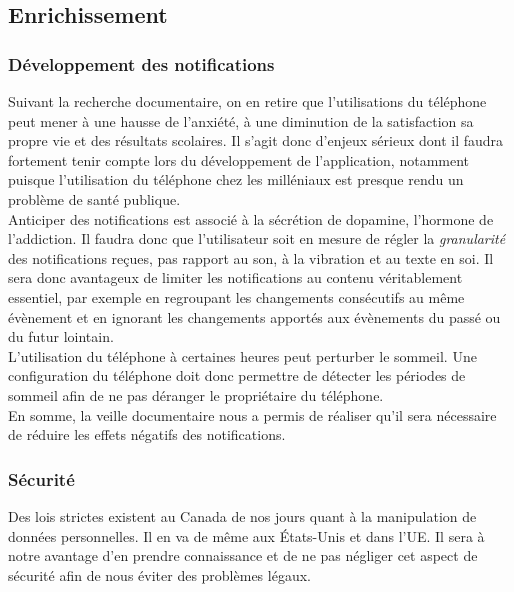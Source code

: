 	\subsection{Enrichissement}
	
		\subsubsection{Développement des notifications}

		Suivant la recherche documentaire, on en retire que l'utilisations du téléphone peut mener à une hausse de l'anxiété, à une diminution de la satisfaction sa propre vie et des résultats scolaires. Il s'agit donc d'enjeux sérieux dont il faudra fortement tenir compte lors du développement de l'application, notamment puisque l'utilisation du téléphone chez les milléniaux est presque rendu un problème de santé publique. \\
		
		Anticiper des notifications est associé à la sécrétion de dopamine, l'hormone de l'addiction. Il faudra donc que l'utilisateur soit en mesure de régler la \emph{granularité} des notifications reçues, pas rapport au son, à la vibration et au texte en soi. Il sera donc avantageux de limiter les notifications au contenu véritablement essentiel, par exemple en regroupant les changements consécutifs au même évènement et en ignorant les changements apportés aux évènements du passé ou du futur lointain. \\
			
		L'utilisation du téléphone à certaines heures peut perturber le sommeil. Une configuration du téléphone doit donc permettre de détecter les périodes de sommeil afin de ne pas déranger le propriétaire du téléphone. \\
		
		En somme, la veille documentaire nous a permis de réaliser qu'il sera nécessaire de réduire les effets négatifs des notifications.
	
		\subsubsection{Sécurité}
		Des lois strictes existent au Canada de nos jours quant à la manipulation de données personnelles. Il en va de même aux États-Unis et dans l'UE. Il sera à notre avantage d'en prendre connaissance et de ne pas négliger cet aspect de sécurité afin de nous éviter des problèmes légaux. \\
		
